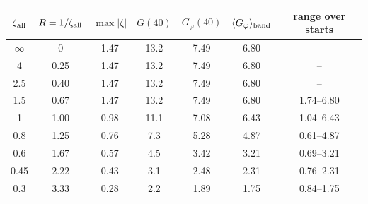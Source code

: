\begin{tabular}{@{}ccccccc@{}}
\toprule
$\zeta_{\rm all}$ & $R=1/\zeta_{\rm all}$ & $\max|\zeta|$ & $G(40)$ & $G_\varphi(40)$ & $\langle G_\varphi\rangle_{\rm band}$ & range over starts\\ \midrule
$\infty$ & 0 & 1.47 & 13.2 & 7.49 & 6.80 & --\\
4 & 0.25 & 1.47 & 13.2 & 7.49 & 6.80 & --\\
2.5 & 0.40 & 1.47 & 13.2 & 7.49 & 6.80 & --\\
1.5 & 0.67 & 1.47 & 13.2 & 7.49 & 6.80 & 1.74--6.80\\
1 & 1.00 & 0.98 & 11.1 & 7.08 & 6.43 & 1.04--6.43\\
0.8 & 1.25 & 0.76 & 7.3 & 5.28 & 4.87 & 0.61--4.87\\
0.6 & 1.67 & 0.57 & 4.5 & 3.42 & 3.21 & 0.69--3.21\\
0.45 & 2.22 & 0.43 & 3.1 & 2.48 & 2.31 & 0.76--2.31\\
0.3 & 3.33 & 0.28 & 2.2 & 1.89 & 1.75 & 0.84--1.75\\
\bottomrule
\end{tabular}
